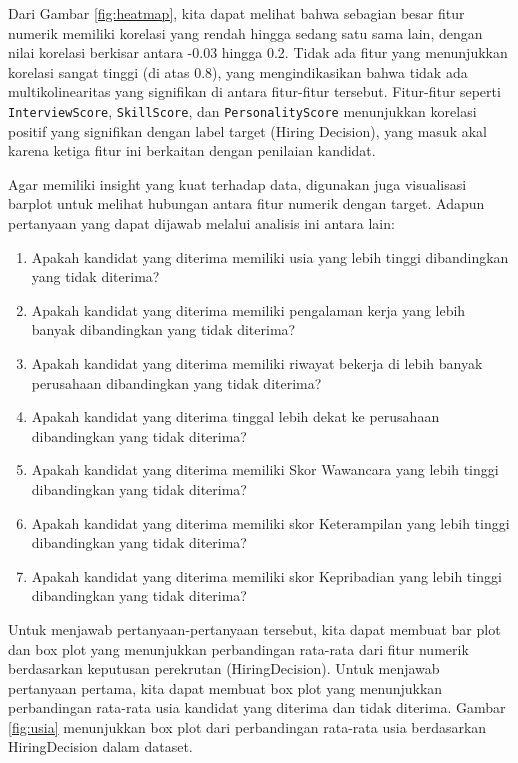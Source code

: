 Dari Gambar \ref{fig:heatmap}, kita dapat melihat bahwa sebagian besar fitur numerik memiliki korelasi yang rendah hingga sedang satu sama lain, dengan nilai korelasi berkisar antara -0.03 hingga 0.2. Tidak ada fitur yang menunjukkan korelasi sangat tinggi (di atas 0.8), yang mengindikasikan bahwa tidak ada multikolinearitas yang signifikan di antara fitur-fitur tersebut. Fitur-fitur seperti \texttt{InterviewScore}, \texttt{SkillScore}, dan \texttt{PersonalityScore} menunjukkan korelasi positif yang signifikan dengan label target (Hiring Decision), yang masuk akal karena ketiga fitur ini berkaitan dengan penilaian kandidat.

Agar memiliki insight yang kuat terhadap data, digunakan juga visualisasi barplot untuk melihat hubungan antara fitur numerik dengan target. Adapun pertanyaan yang dapat dijawab melalui analisis ini antara lain:

\begin{enumerate}
    \item Apakah kandidat yang diterima memiliki usia yang lebih tinggi dibandingkan yang tidak diterima?
    \item Apakah kandidat yang diterima memiliki pengalaman kerja yang lebih banyak dibandingkan yang tidak diterima?
    \item Apakah kandidat yang diterima memiliki riwayat bekerja di lebih banyak perusahaan dibandingkan yang tidak diterima?
    \item Apakah kandidat yang diterima tinggal lebih dekat ke perusahaan dibandingkan yang tidak diterima?
    \item Apakah kandidat yang diterima memiliki Skor Wawancara yang lebih tinggi dibandingkan yang tidak diterima?
    \item Apakah kandidat yang diterima memiliki skor Keterampilan yang lebih tinggi dibandingkan yang tidak diterima?
    \item Apakah kandidat yang diterima memiliki skor Kepribadian yang lebih tinggi dibandingkan yang tidak diterima?
\end{enumerate}

Untuk menjawab pertanyaan-pertanyaan tersebut, kita dapat membuat bar plot dan box plot yang menunjukkan perbandingan rata-rata dari fitur numerik berdasarkan keputusan perekrutan (HiringDecision). Untuk menjawab pertanyaan pertama, kita dapat membuat box plot yang menunjukkan perbandingan rata-rata usia kandidat yang diterima dan tidak diterima. Gambar \ref{fig:usia} menunjukkan box plot dari perbandingan rata-rata usia berdasarkan HiringDecision dalam dataset.

